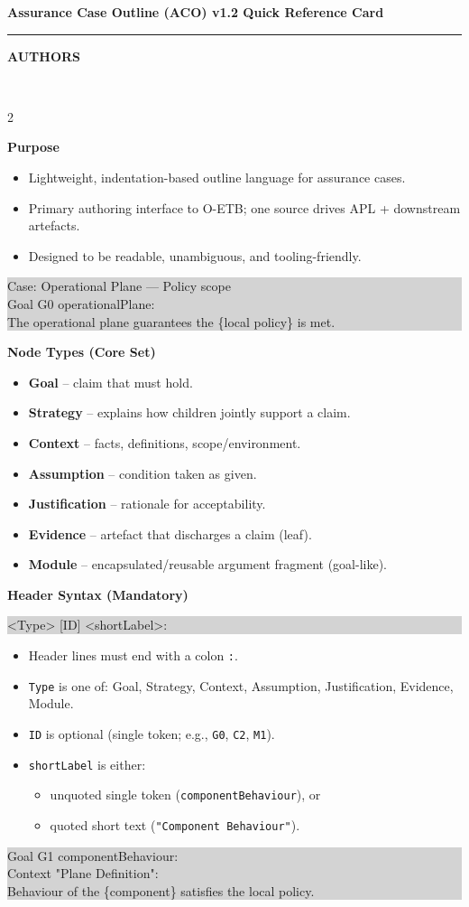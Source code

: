 \documentclass[10pt,letterpaper]{article}
\newcommand{\CardTitle}[1]{%
  \begin{center}
    {\Large\bfseries #1}\\[-2pt]
    \rule{0.92\linewidth}{0.6pt}
  \end{center}
}
\newcommand{\BannerBox}[1]{%
  \noindent\colorbox{Banner}{%
    \parbox{\linewidth}{\color{white}\bfseries\small\hspace{6pt}#1\hspace{6pt}}%
  }\\[10pt]
}
\newcommand{\Sec}[1]{%
  \vspace{5pt}%
  \noindent{\color{RuleGray}\rule{\linewidth}{0.35pt}}\par
  \vspace{2pt}%
  {\bfseries #1}\par
  \vspace{2pt}%
}
\newcommand{\Example}[1]{%
  \vspace{1pt}%
  \noindent\colorbox{LightGray}{%
    \parbox{\linewidth}{\ttfamily\footnotesize\raggedright
#1
    }%
  }%
  \vspace{2pt}%
}
\begin{document}
\CardTitle{Assurance Case Outline (ACO) v1.2 Quick Reference Card}
\BannerBox{AUTHORS}

\begin{multicols*}{2}
\raggedcolumns

\Sec{Purpose}
\begin{itemize}
  \item Lightweight, indentation-based outline language for assurance cases.
  \item Primary authoring interface to O-ETB; one source drives APL + downstream artefacts.
  \item Designed to be readable, unambiguous, and tooling-friendly.
\end{itemize}
\Example{Case: Operational Plane --- Policy scope\\
Goal G0 operationalPlane:\\
\hspace*{1.5em}The operational plane guarantees the \string\{local policy\string\} is met.}

\Sec{Node Types (Core Set)}
\begin{itemize}
  \item \textbf{Goal} -- claim that must hold.
  \item \textbf{Strategy} -- explains how children jointly support a claim.
  \item \textbf{Context} -- facts, definitions, scope/environment.
  \item \textbf{Assumption} -- condition taken as given.
  \item \textbf{Justification} -- rationale for acceptability.
  \item \textbf{Evidence} -- artefact that discharges a claim (leaf).
  \item \textbf{Module} -- encapsulated/reusable argument fragment (goal-like).
\end{itemize}

\Sec{Header Syntax (Mandatory)}
\Example{<Type> [ID] <shortLabel>:}
\begin{itemize}
  \item Header lines must end with a colon \texttt{:}.
  \item \texttt{Type} is one of: Goal, Strategy, Context, Assumption, Justification, Evidence, Module.
  \item \texttt{ID} is optional (single token; e.g., \texttt{G0}, \texttt{C2}, \texttt{M1}).
  \item \texttt{shortLabel} is either:
  \begin{itemize}
    \item unquoted single token (\texttt{componentBehaviour}), or
    \item quoted short text (\texttt{"Component Behaviour"}).
  \end{itemize}
\end{itemize}
\Example{Goal G1 componentBehaviour:\\
Context "Plane Definition":\\
\hspace*{1.5em}Behaviour of the \string\{component\string\} satisfies the local policy.}


\end{multicols*}
\end{document}
